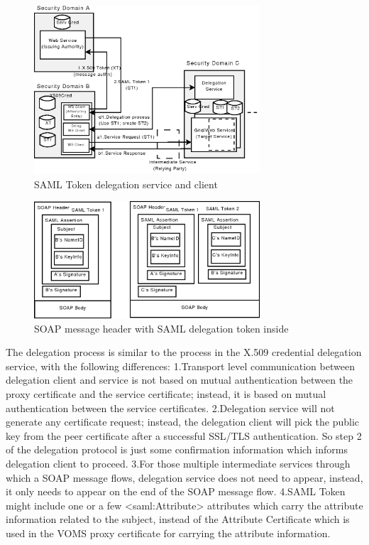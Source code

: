 \documentclass[twocolumn]{svjour3}         %
\begin{document}
\begin{figure}
\includegraphics[width=0.75\textwidth]{SAMLDelegation.png}
\caption{SAML Token delegation service and client}
\label{fig:SAMLDelegation}
\end{figure}

\begin{figure}
\includegraphics[width=0.75\textwidth]{SAMLDelegationMessage.png}
\caption{SOAP message header with SAML delegation token inside}
\label{fig:SAMLDelegationMessage}
\end{figure}
The delegation process is similar to the process in the X.509 credential delegation service, with the following differences:
1.Transport level communication between delegation client and service is not based on mutual authentication between the proxy certificate and the service certificate; instead, it is based on mutual authentication between the service certificates.
2.Delegation service will not generate any certificate request; instead, the delegation client will pick the public key from the peer certificate after a successful SSL/TLS authentication. So step 2 of the delegation protocol is just some confirmation information which informs delegation client to proceed.
3.For those multiple intermediate services through which a SOAP message flows, delegation service does not need to appear, instead, it only needs to appear on the end of the SOAP message flow.
4.SAML Token might include one or a few <saml:Attribute> attributes which carry the attribute information related to the subject, instead of the Attribute Certificate which is used in the VOMS proxy certificate for carrying the attribute information.
\end{document}
